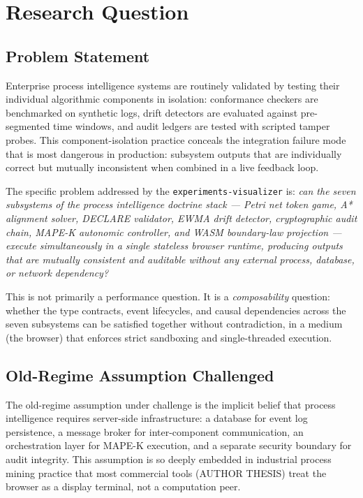 
\section{Research Question}
\label{sec:experiments-visualizer-rq}

\subsection{Problem Statement}
\label{sec:experiments-visualizer-rq-problem}

Enterprise process intelligence systems are routinely validated by testing their individual
algorithmic components in isolation: conformance checkers are benchmarked on synthetic logs,
drift detectors are evaluated against pre-segmented time windows, and audit ledgers are tested
with scripted tamper probes. This component-isolation practice conceals the integration failure
mode that is most dangerous in production: subsystem outputs that are individually correct but
mutually inconsistent when combined in a live feedback loop.

The specific problem addressed by the \texttt{experiments-visualizer} is: \emph{can the seven
subsystems of the process intelligence doctrine stack — Petri net token game, A* alignment
solver, DECLARE validator, EWMA drift detector, cryptographic audit chain, MAPE-K autonomic
controller, and WASM boundary-law projection — execute simultaneously in a single stateless
browser runtime, producing outputs that are mutually consistent and auditable without any
external process, database, or network dependency?}

This is not primarily a performance question. It is a \emph{composability} question: whether
the type contracts, event lifecycles, and causal dependencies across the seven subsystems can
be satisfied together without contradiction, in a medium (the browser) that enforces strict
sandboxing and single-threaded execution.

\subsection{Old-Regime Assumption Challenged}
\label{sec:experiments-visualizer-rq-old-regime}

The old-regime assumption under challenge is the implicit belief that process intelligence
requires server-side infrastructure: a database for event log persistence, a message broker for
inter-component communication, an orchestration layer for MAPE-K execution, and a separate
security boundary for audit integrity. This assumption is so deeply embedded in industrial
process mining practice that most commercial tools (AUTHOR THESIS) treat the browser as a
display terminal, not a computation peer.

